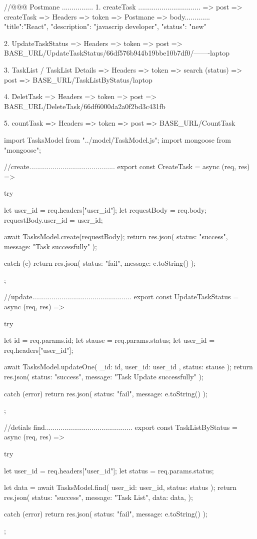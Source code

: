 //@@@ Postmane ................
1. createTask ................................
   => post =>  createTask => Headers => token
   => Postmane => body.............
           {
             "title":"React",
             "description": "javascrip developer",
             "status": "new"
            }

2. UpdateTaskStatus => Headers => token
=> post => {{BASE_URL}}/UpdateTaskStatus/66df576b944b19bbe10b7df0/-------laptop

3. TaskList / TaskList Details => Headers => token  => search (status)
   => post =>  {{BASE_URL}}/TaskListByStatus/laptop

4. DeletTask => Headers => token
   => post =>  {{BASE_URL}}/DeleteTask/66df6000da2a0f2bd3c431fb

5. countTask => Headers => token
   => post => {{BASE_URL}}/CountTask


import TasksModel from "../model/TaskModel.js";
import mongoose from "mongoose";

//create............................................
export const CreateTask = async (req, res) => {
  try {
    let user_id = req.headers["user_id"];
    let requestBody = req.body;
    requestBody.user_id = user_id;

    await TasksModel.create(requestBody);
    return res.json({ status: "success", message: "Task successfully" });
  } catch (e) {
    return res.json({ status: "fail", message: e.toString() });
  }
};

//update...................................................
export const UpdateTaskStatus = async (req, res) => {
  try {
    let id = req.params.id;
    let stause = req.params.status;
    let user_id = req.headers["user_id"];

    await TasksModel.updateOne(
      { _id: id, user_id: user_id },
      { status: stause }
    );
    return res.json({ status: "success", message: "Task Update successfully" });
  } catch (error) {
    return res.json({ status: "fail", message: e.toString() });
  }
};

//detials find.............................................
export const TaskListByStatus = async (req, res) => {
  try {
    let user_id = req.headers["user_id"];
    let status = req.params.status;

    let data = await TasksModel.find({ user_id: user_id, status: status });
    return res.json({
      status: "success",
      message: "Task List",
      data: data,
    });
  } catch (error) {
    return res.json({ status: "fail", message: e.toString() });
  }
};

